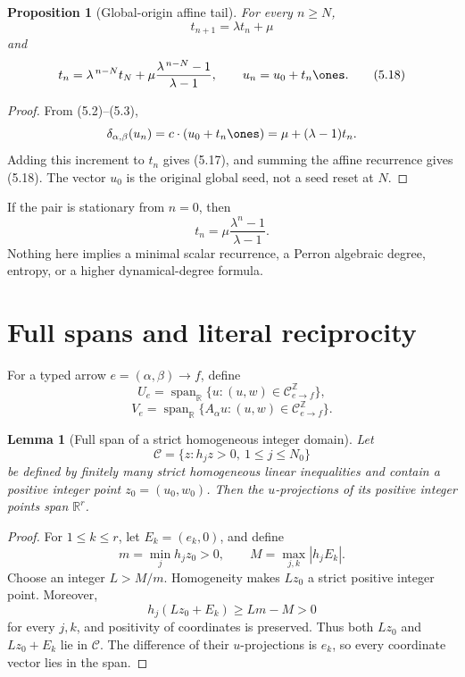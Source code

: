 \documentclass[11pt]{article}
\newtheorem{proposition}[theorem]{Proposition}
\newtheorem{lemma}[theorem]{Lemma}
\theoremstyle{definition}
\theoremstyle{remark}
\begin{document}
\begin{proposition}[Global-origin affine tail]
\label{prop:tail}
For every \(n\geq N\),
\[
 t_{n+1}=\lambda t_n+\mu
\tag{5.17}
\]
and
\[
 t_n=\lambda^{\,n-N}t_N+
 \mu\frac{\lambda^{\,n-N}-1}{\lambda-1},
 \qquad u_n=u_0+t_n\ones.
\tag{5.18}
\]
\end{proposition}

\begin{proof}
From (5.2)--(5.3),
\[
 \delta_{\alpha,\beta}(u_n)
 =c\cdot(u_0+t_n\ones)
 =\mu+(\lambda-1)t_n.
\]
Adding this increment to \(t_n\) gives (5.17), and summing the affine
recurrence gives (5.18).  The vector \(u_0\) is the original global seed,
not a seed reset at \(N\).
\end{proof}

If the pair is stationary from \(n=0\), then
\[
 t_n=\mu\frac{\lambda^n-1}{\lambda-1}.
\]
Nothing here implies a minimal scalar recurrence, a Perron algebraic degree,
entropy, or a higher dynamical-degree formula.

\section{Full spans and literal reciprocity}

For a typed arrow \(e=(\alpha,\beta)\to f\), define
\[
 U_e=\operatorname{span}_{\mathbb R}
 \{u:(u,w)\in\mathcal C_{e\to f}^{\mathbb Z}\},
\]
\[
 V_e=\operatorname{span}_{\mathbb R}
 \{A_\alpha u:(u,w)\in\mathcal C_{e\to f}^{\mathbb Z}\}.
\]

\begin{lemma}[Full span of a strict homogeneous integer domain]
\label{lem:full-span}
Let
\[
 \mathcal C=\{z:h_jz>0,\ 1\leq j\leq N_0\}
\]
be defined by finitely many strict homogeneous linear inequalities and
contain a positive integer point \(z_0=(u_0,w_0)\).  Then the
\(u\)-projections of its positive integer points span \(\mathbb R^r\).
\end{lemma}

\begin{proof}
For \(1\leq k\leq r\), let \(E_k=(e_k,0)\), and define
\[
 m=\min_jh_jz_0>0,\qquad M=\max_{j,k}|h_jE_k|.
\]
Choose an integer \(L>M/m\).  Homogeneity makes \(Lz_0\) a strict positive
integer point.  Moreover,
\[
 h_j(Lz_0+E_k)\geq Lm-M>0
\]
for every \(j,k\), and positivity of coordinates is preserved.  Thus both
\(Lz_0\) and \(Lz_0+E_k\) lie in \(\mathcal C\).  The difference of their
\(u\)-projections is \(e_k\), so every coordinate vector lies in the span.
\end{proof}
\end{document}
